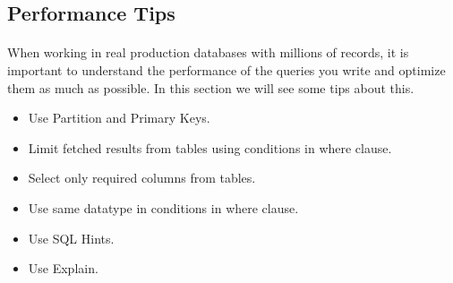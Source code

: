\subsection{Performance Tips}
\paragraph{} When working in real production databases with millions of records, it is important to understand the performance of the queries you write and optimize them as much as possible. In this section we will see some tips about this.
\begin{itemize}
	\item Use Partition and Primary Keys.
	\item Limit fetched results from tables using conditions in where clause.
	\item Select only required columns from tables.
	\item Use same datatype in conditions in where clause.
	\item Use SQL Hints.
	\item Use Explain.
\end{itemize}
